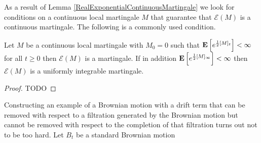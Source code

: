 As a result of Lemma \ref{RealExponentialContinuousMartingale} we look for conditions on a continuous local martingale $M$ that guarantee that $\mathcal{E}(M)$ is a continuous martingale.  The following is a commonly used condition.
\begin{lem}\label{NovikovsCondition}Let $M$ be a continuous local martingale with $M_0 = 0$ such that $\textbf{E}\left[e^{\frac{1}{2}[M]_t}\right] < \infty$ for all $t \geq 0$ then $\mathcal{E}(M)$ is a martingale.  If in addition $\textbf{E}\left[e^{\frac{1}{2}[M]_\infty}\right] < \infty$ then $\mathcal{E}(M)$ is a uniformly integrable martingale.
\end{lem}
\begin{proof}
TODO
\end{proof}

\begin{examp}Constructing an example of a Brownian motion with a drift term that can be removed with respect to a filtration generated by the Brownian motion but cannot be removed with respect to the completion of that filtration turns out not to be too hard. Let $B_t$ be a standard Brownian motion 
\end{examp}

